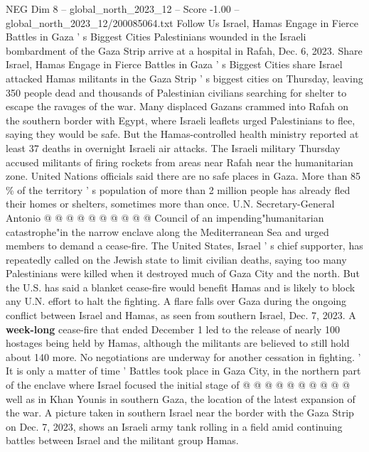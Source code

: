 \begin{textsample}{NEG Dim 8 – global\_north\_2023\_12 – Score -1.00 – global\_north\_2023\_12/200085064.txt}  \label{ex:f8_neg_177}
Follow Us Israel, Hamas Engage in Fierce Battles in Gaza ' s Biggest Cities Palestinians wounded in the Israeli bombardment of the Gaza Strip arrive at a hospital in Rafah, Dec. 6, 2023.
Share Israel, Hamas Engage in Fierce Battles in Gaza ' s Biggest Cities share Israel attacked Hamas militants in the Gaza Strip ' s biggest cities on Thursday, leaving 350 people dead and thousands of Palestinian civilians searching for shelter to escape the ravages of the war.
Many displaced Gazans crammed into Rafah on the southern border with Egypt, where Israeli leaflets urged Palestinians to flee, saying they would be safe.
But the Hamas-controlled health ministry reported at least 37 deaths in overnight Israeli air attacks.
The Israeli military Thursday accused militants of firing rockets from areas near Rafah near the humanitarian zone.
United Nations officials said there are no safe places in Gaza.
More than 85 \% of the territory ' s population of more than 2 million people has already fled their homes or shelters, sometimes more than once.
U.N.
Secretary-General Antonio @ @ @ @ @ @ @ @ @ @ Council of an impending"humanitarian catastrophe"in the narrow enclave along the Mediterranean Sea and urged members to demand a cease-fire.
The United States, Israel ' s chief supporter, has repeatedly called on the Jewish state to limit civilian deaths, saying too many Palestinians were killed when it destroyed much of Gaza City and the north.
But the U.S. has said a blanket cease-fire would benefit Hamas and is likely to block any U.N. effort to halt the fighting.
A flare falls over Gaza during the ongoing conflict between Israel and Hamas, as seen from southern Israel, Dec. 7, 2023.
A \textbf{week-long} cease-fire that ended December 1 led to the release of nearly 100 hostages being held by Hamas, although the militants are believed to still hold about 140 more.
No negotiations are underway for another cessation in fighting. ' It is only a matter of time ' Battles took place in Gaza City, in the northern part of the enclave where Israel focused the initial stage of @ @ @ @ @ @ @ @ @ @ well as in Khan Younis in southern Gaza, the location of the latest expansion of the war.
A picture taken in southern Israel near the border with the Gaza Strip on Dec. 7, 2023, shows an Israeli army tank rolling in a field amid continuing battles between Israel and the militant group Hamas.

\end{textsample}
